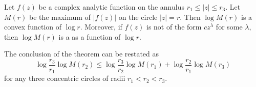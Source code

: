 \documentclass[12pt]{article}
\newcommand*{\abs}[1]{\left\lvert #1\right\rvert}
\begin{document}
Let $f(z)$ be a complex analytic function on the annulus
$r_1\leq\abs{z}\leq r_3$. Let $M(r)$ be the maximum of
$\abs{f(z)}$ on the circle $\abs{z}=r$. Then $\log M(r)$ is a
convex function of $\log r$. Moreover, if $f(z)$ is not of the form $cz^\lambda$ for some $\lambda$, then $\log M(r)$ is a  as a function of $\log r$.

The conclusion of the theorem can be restated as
\begin{equation*}
\log\frac{r_3}{r_1} \log M(r_2) \leq \log\frac {r_3}{r_2} \log M(r_1) + 
\log\frac {r_2}{r_1} \log M(r_3)
\end{equation*}
for any three concentric circles of radii $r_1<r_2<r_3$.
\end{document}
